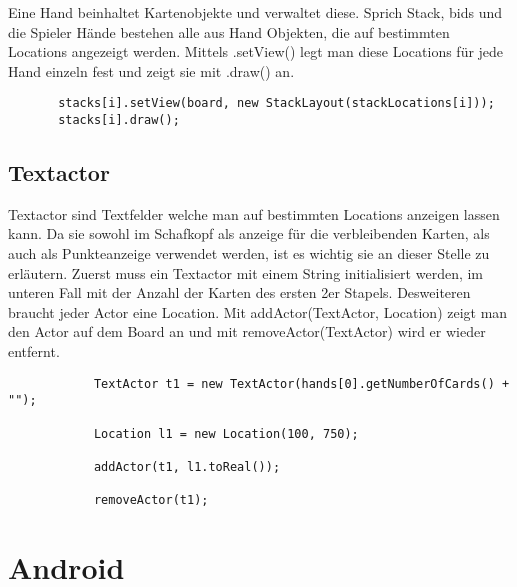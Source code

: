 Eine Hand beinhaltet Kartenobjekte und verwaltet diese. Sprich Stack, bids und die Spieler Hände bestehen alle aus Hand Objekten, die auf bestimmten Locations angezeigt werden.
Mittels .setView() legt man diese Locations für jede Hand einzeln fest und zeigt sie mit .draw() an.
	      \begin{lstlisting}
	   stacks[i].setView(board, new StackLayout(stackLocations[i]));
	   stacks[i].draw();
	\end{lstlisting}

\subsection{Textactor}
Textactor sind Textfelder welche man auf bestimmten Locations anzeigen lassen kann.
Da sie sowohl im Schafkopf als anzeige für die verbleibenden Karten, als auch als Punkteanzeige verwendet werden, ist es wichtig sie an dieser Stelle zu erläutern.
Zuerst muss ein Textactor mit einem String initialisiert werden, im unteren Fall mit der Anzahl der Karten des ersten 2er Stapels. Desweiteren braucht jeder Actor eine Location.
Mit addActor(TextActor, Location) zeigt man den Actor auf dem Board an und mit removeActor(TextActor) wird er wieder entfernt.


\begin{lstlisting}
	        TextActor t1 = new TextActor(hands[0].getNumberOfCards() + "");

            Location l1 = new Location(100, 750);

			addActor(t1, l1.toReal());

			removeActor(t1);
\end{lstlisting}







\section{Android}
